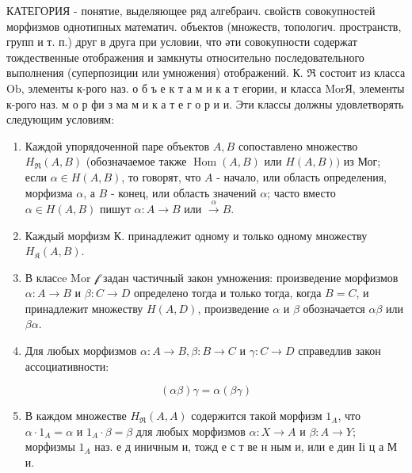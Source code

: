 \documentclass[10pt]{article}
\begin{document}
КАТЕГОРИЯ - понятие, выделяющее ряд алгебраич. свойств совокупностей морфизмов однотипных математич. объектов (множеств, топологич. пространств, групп и т. п.) друг в друга при условии, что әти совокупности содержат тождественные отображения и замкнуты относительно последовательного выполнения (суперпозиции или умножения) отображений. $К$. $\mathfrak{\Re}$ состоит из класса $\mathrm{Ob}$, элементы к-рого наз. о б ъ е к т а м и к а т егории, и класса MorЯ, элементы к-рого наз. м о р фи з ма м и к а т е г о р и и. Эти классы должны удовлетворять следующим условиям:



\begin{enumerate}

  \item Каждой упорядоченной паре объектов $A, B$ сопоставлено множество $H_{\Re}(A, B)$ (обозначаемое также $\operatorname{Hom}(A, B)$ или $H(A, B))$ из Мог; если $\alpha \in H(A, B)$, то говорят, что $A$ - начало, или область определения, морфизма $\alpha$, а $B$ - конец, или область значений $\alpha$; часто вместо $\alpha \in H(A, B)$ пишут $\alpha: A \rightarrow B$ или $\stackrel{\alpha}{\rightarrow} B$.



  \item Каждый морфизм К. принадлежит одному и только одному множеству $H_{\mathfrak{K}}(A, B)$.



  \item В класce Mor $\mathscr{f}$ задан частичный закон умножения: произведение морфизмов $\alpha: A \rightarrow B$ и $\beta: C \rightarrow D$ определено тогда и только тогда, когда $B=C$, и принадлежит множеству $H(A, D)$, произведение $\alpha$ и $\beta$ обозначается $\alpha \beta$ или $\beta \alpha$.



  \item Для любых морфизмов $\alpha: A \rightarrow B, \beta: B \rightarrow C$ и $\gamma: C \rightarrow D$ справедлив закон ассоциативности:



\end{enumerate}



\[

(\alpha \beta) \gamma=\alpha(\beta \gamma)

\]



\begin{enumerate}

  \setcounter{enumi}{4}

  \item В каждом множестве $H_{\Re}(A, A)$ содержится такой морфизм $1_{A}$, что $\alpha \cdot 1_{A}=\alpha$ и $1_{A} \cdot \beta=\beta$ для любых морфизмов $\alpha: X \rightarrow A$ и $\beta: A \rightarrow Y$; морфизмы $1_{A}$ наз. е д иничным и, тожд е с т ве н ным и, или е дин Іі ц а М и.

\end{enumerate}
\end{document}
